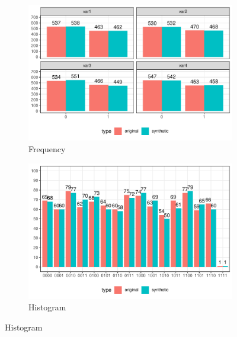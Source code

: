 \documentclass[runningheads]{llncs}
\begin{document}
\begin{figure}[!h]
    \centering
    \caption{Compare original and synthetic data}
    \begin{subfigure}{0.48\textwidth}
        \includegraphics[width=\textwidth]{../graphs/graph_cart_frequency_compare.pdf}
        \caption{Frequency}
        \label{fig:frequency_compare}
    \end{subfigure}
    \hfill
    \begin{subfigure}{0.48\textwidth}
        \includegraphics[width=\textwidth]{../graphs/graph_cart_histogram_compare.pdf}
        \caption{Histogram}
        \label{fig:histogram_compare}
    \end{subfigure}
    \label{fig:compare}
\end{figure}
\end{document}
